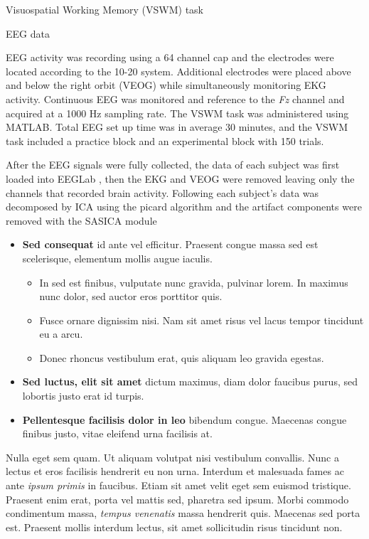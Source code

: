 \documentclass[final]{beamer}
\newlength{\colwidth}
\begin{document}
\begin{frame}[t]
\begin{columns}[t]
\begin{column}{\colwidth}
\begin{block}{Visuospatial Working Memory (VSWM) task}
  \end{block}

  \begin{block}{EEG data}
    
    EEG activity was recording using a 64 channel cap and the electrodes were located according to the 10-20 system. Additional electrodes were placed above and below the right orbit (VEOG) while simultaneously monitoring EKG activity. Continuous EEG was monitored and reference to the \textit{Fz} channel and acquired at a 1000 Hz sampling rate. The VSWM task was administered using MATLAB. Total EEG set up time was in average 30 minutes, and the VSWM task included a practice block and an experimental block with 150 trials.

    After the EEG signals were fully collected, the data of each subject was first loaded into EEGLab \citep{delorme2004eeglab}, then the EKG and VEOG were removed leaving only the channels that recorded brain activity. Following each subject's data was decomposed by ICA using the picard algorithm and the artifact components were removed with the SASICA module

    \begin{itemize}
      \item \textbf{Sed consequat} id ante vel efficitur. Praesent congue massa
        sed est scelerisque, elementum mollis augue iaculis.
        \begin{itemize}
          \item In sed est finibus, vulputate
            nunc gravida, pulvinar lorem. In maximus nunc dolor, sed auctor eros
            porttitor quis.
          \item Fusce ornare dignissim nisi. Nam sit amet risus vel lacus
            tempor tincidunt eu a arcu.
          \item Donec rhoncus vestibulum erat, quis aliquam leo
            gravida egestas.
        \end{itemize}
      \item \textbf{Sed luctus, elit sit amet} dictum maximus, diam dolor
        faucibus purus, sed lobortis justo erat id turpis.
      \item \textbf{Pellentesque facilisis dolor in leo} bibendum congue.
        Maecenas congue finibus justo, vitae eleifend urna facilisis at.
    \end{itemize}
    
    Nulla eget sem quam. Ut aliquam volutpat nisi vestibulum convallis. Nunc a
    lectus et eros facilisis hendrerit eu non urna. Interdum et malesuada fames
    ac ante \textit{ipsum primis} in faucibus. Etiam sit amet velit eget sem
    euismod tristique. Praesent enim erat, porta vel mattis sed, pharetra sed
    ipsum. Morbi commodo condimentum massa, \textit{tempus venenatis} massa
    hendrerit quis. Maecenas sed porta est. Praesent mollis interdum lectus,
    sit amet sollicitudin risus tincidunt non.
  \end{block}


\end{column}
\end{columns}
\end{frame}
\end{document}
